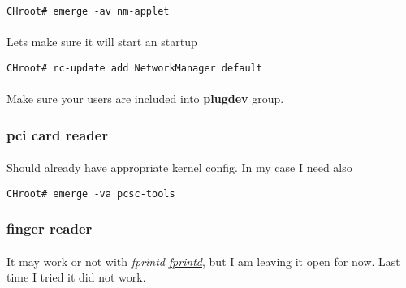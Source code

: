 \documentclass[11pt,a4paper]{article}
\begin{document}
                    \begin{lstlisting}[style=BashInputCHRoot]
 CHroot# emerge -av nm-applet
                    \end{lstlisting}

                    \paragraph{} Lets make sure it will start an startup

                    \begin{lstlisting}[style=BashInputCHRoot]
 CHroot# rc-update add NetworkManager default
                    \end{lstlisting}

                    \paragraph{} Make sure your users are included into \textbf{plugdev} group.

                \newpage
                \subsubsection{pci card reader}

                    \paragraph{} Should already have appropriate kernel config. In my case I need also

                    \begin{lstlisting}[style=BashInputCHRoot]
 CHroot# emerge -va pcsc-tools
                    \end{lstlisting}

                \newpage
                \subsubsection{finger reader}

                    \paragraph{} It may work or not with \textit{fprintd} \href{https://wiki.gentoo.org/wiki/Fingerprint_Reader}{\textit{fprintd}}, but I am leaving it open for now. Last time I tried it did not work.
\end{document}
